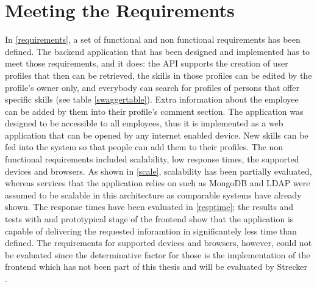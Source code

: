\section{Meeting the Requirements}
In \ref{requirements}, a set of functional and non functional requirements has been defined. The backend application that has been designed and implemented has to meet those requirements, and it does: the API supports the creation of user profiles that then can be retrieved, the skills in those profiles can be edited by the profile's owner only, and everybody can search for profiles of persons that offer specific skills (see table \ref{swaggertable}). Extra information about the employee can be added by them into their profile's comment section. The application was designed to be accessible to all employees, thus it is implemented as a web application that can be opened by any internet enabled device. New skills can be fed into the system so that people can add them to their profiles. \newline
The non functional requirements included scalability, low response times, the supported devices and browsers.
As shown in \ref{scale}, scalability has been partially evaluated, whereas services that the application relies on such as MongoDB and LDAP were assumed to be scalable in this architecture as comparable systems have already shown. The response times have been evaluated in \ref{resptime}; the results and tests with and prototypical stage of the frontend show that the application is capable of delivering the requested inforamtion in significantely less time than defined.
The requirements for supported devices and browsers, however, could not be evaluated since the determinative factor for those is the implementation of the frontend which has not been part of this thesis and will be evaluated by Strecker \cite{strecker}.
